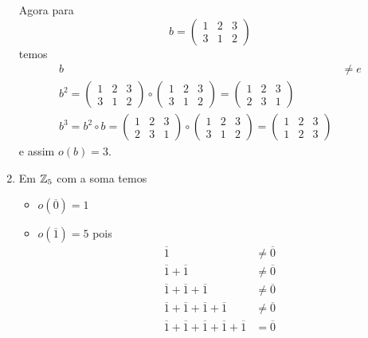 \begin{exemplos}
\begin{enumerate}[label={\arabic*})]
        Agora para
        \[
            b = \begin{pmatrix}
                1 & 2 & 3\\
                3 & 1 & 2
            \end{pmatrix}
        \]
        temos
        \begin{align*}
            b &\ne e\\
            b^2 = \begin{pmatrix}
                1 & 2 & 3\\
                3 & 1 & 2
            \end{pmatrix} \circ \begin{pmatrix}
                1 & 2 & 3\\
                3 & 1 & 2
            \end{pmatrix} = \begin{pmatrix}
                1 & 2 & 3\\
                2 & 3 & 1
            \end{pmatrix}\\
            b^3 = b^2 \circ b = \begin{pmatrix}
                1 & 2 & 3\\
                2 & 3 & 1
            \end{pmatrix} \circ \begin{pmatrix}
                1 & 2 & 3\\
                3 & 1 & 2
            \end{pmatrix} = \begin{pmatrix}
                1 & 2 & 3\\
                1 & 2 & 3
            \end{pmatrix}
        \end{align*}
        e assim $o(b) = 3$.

        \item Em $\mathbb{Z}_5$ com a soma temos
        \begin{itemize}
            \item $o(\overline{0}) = 1$

            \item $o(\overline{1}) = 5$ pois
            \begin{align*}
                \overline{1} &\ne \overline{0}\\
                \overline{1} + \overline{1} &\ne \overline{0}\\
                \overline{1} + \overline{1} + \overline{1} &\ne \overline{0}\\
                \overline{1} + \overline{1} + \overline{1} + \overline{1} &\ne \overline{0}\\
                \overline{1} + \overline{1} + \overline{1} + \overline{1} + \overline{1} &= \overline{0}
            \end{align*}


\end{itemize}
\end{enumerate}
\end{exemplos}
